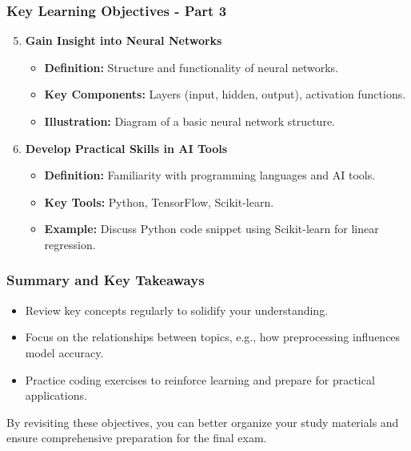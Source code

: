 \documentclass{beamer}
\begin{document}
\begin{frame}[fragile]
    \frametitle{Key Learning Objectives - Part 3}
    \begin{enumerate}
        \setcounter{enumi}{4} %
        \item \textbf{Gain Insight into Neural Networks}
            \begin{itemize}
                \item \textbf{Definition:} Structure and functionality of neural networks.
                \item \textbf{Key Components:} Layers (input, hidden, output), activation functions.
                \item \textbf{Illustration:} Diagram of a basic neural network structure.
            \end{itemize}
        
        \item \textbf{Develop Practical Skills in AI Tools}
            \begin{itemize}
                \item \textbf{Definition:} Familiarity with programming languages and AI tools.
                \item \textbf{Key Tools:} Python, TensorFlow, Scikit-learn.
                \item \textbf{Example:} Discuss Python code snippet using Scikit-learn for linear regression.
            \end{itemize}
    \end{enumerate}
\end{frame}

\begin{frame}[fragile]
    \frametitle{Summary and Key Takeaways}
    \begin{itemize}
        \item Review key concepts regularly to solidify your understanding.
        \item Focus on the relationships between topics, e.g., how preprocessing influences model accuracy.
        \item Practice coding exercises to reinforce learning and prepare for practical applications.
    \end{itemize}

    By revisiting these objectives, you can better organize your study materials and ensure comprehensive preparation for the final exam.
\end{frame}
\end{document}
